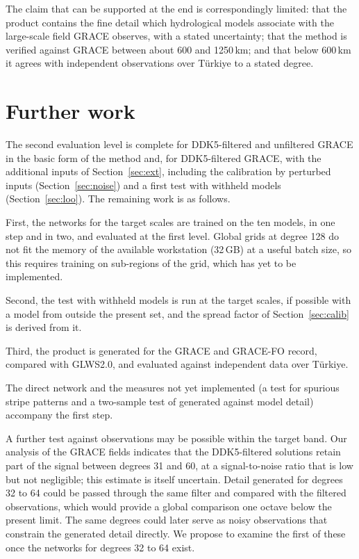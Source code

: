 \documentclass[11pt,a4paper]{article}
\begin{document}
The claim that can be supported at the end is correspondingly limited: that the product
contains the fine detail which hydrological models associate with the large-scale field GRACE
observes, with a stated uncertainty; that the method is verified against GRACE between about
600 and 1250\,km; and that below 600\,km it agrees with independent observations over Türkiye
to a stated degree.

\section{Further work}\label{sec:plan}

The second evaluation level is complete for DDK5-filtered and unfiltered GRACE in the basic
form of the method and, for DDK5-filtered GRACE, with the additional inputs of
Section~\ref{sec:ext}, including the calibration by perturbed inputs
(Section~\ref{sec:noise}) and a first test with withheld models (Section~\ref{sec:loo}).
The remaining work is as follows.

First, the networks for the target scales are trained on the ten models, in one step and in
two, and evaluated at the first level. Global grids at degree 128 do not fit the memory of the
available workstation (32\,GB) at a useful batch size, so this requires training on
sub-regions of the grid, which has yet to be implemented.

Second, the test with withheld models is run at the target scales, if possible with a model
from outside the present set, and the spread factor of Section~\ref{sec:calib} is derived
from it.

Third, the product is generated for the GRACE and GRACE-FO record, compared with GLWS2.0, and
evaluated against independent data over Türkiye.

The direct network and the measures not yet implemented (a test for spurious stripe patterns
and a two-sample test of generated against model detail) accompany the first step.

A further test against observations may be possible within the target band. Our analysis of
the GRACE fields indicates that the DDK5-filtered solutions retain part of the signal between
degrees 31 and 60, at a signal-to-noise ratio that is low but not negligible; this estimate
is itself uncertain. Detail generated for degrees 32 to 64 could be passed through the same
filter and compared with the filtered observations, which would provide a global comparison
one octave below the present limit. The same degrees could later serve as noisy observations
that constrain the generated detail directly. We propose to examine the first of these once
the networks for degrees 32 to 64 exist.
\end{document}
